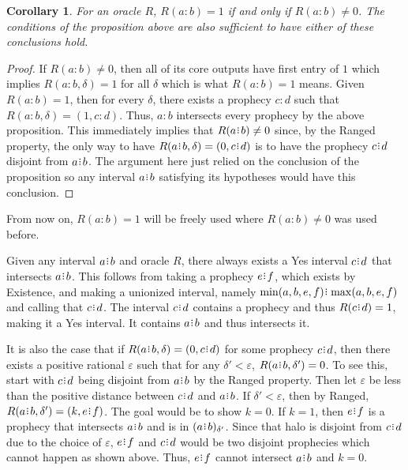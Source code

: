 \documentclass[12pt]{article}
\newtheorem{corollary}{Corollary}[section]
\begin{document}
\begin{corollary}
    For an oracle $R$, $R(a:b) = 1$ if and only if $R(a:b) \neq 0$. The conditions of the proposition above are also sufficient to have either of these conclusions hold. 
\end{corollary}

\begin{proof}
    If $R(a:b) \neq 0$, then all of its core outputs have first entry of $1$ which implies $R(a:b, \delta)=1$ for all $\delta$ which is what $R(a:b) = 1$ means. Given $R(a:b)= 1$, then for every $\delta$, there exists a prophecy $c:d$ such that $R(a:b, \delta) = (1, c:d)$. Thus, $a:b$ intersects every prophecy by the above proposition. This immediately implies that $R(a\rint b) \neq 0$ since, by the Ranged property, the only way to have $R(a\rint b, \delta) = (0, c\rint d)$ is to have the prophecy $c\rint d$ disjoint from $a\rint b$. The argument here just relied on the conclusion of the proposition so any interval $a \rint b$ satisfying its hypotheses would have this conclusion. 
\end{proof}

From now on, $R(a:b)=1$ will be freely used where $R(a:b) \neq 0$ was used before. 


Given any interval $a\rint b$ and oracle $R$, there always exists a Yes interval $c\rint d$ that intersects $a\rint b$. This follows from taking a prophecy $e\rint f$, which exists by Existence, and making a unionized interval, namely $\min(a,b,e,f)\rint \max(a,b,e,f)$ and calling that $c\rint d$. The interval $c\rint d$ contains a prophecy and thus $R(c\rint d) = 1$, making it a Yes interval. It contains $a\rint b$ and thus intersects it. 

It is also the case that if $R(a\rint b, \delta) = (0, c\rint d)$ for some prophecy $c\rint d$, then there exists a positive rational $\varepsilon$ such that for any $\delta' < \varepsilon$, $R(a\rint b, \delta') = 0$. To see this, start with $c\rint d$ being disjoint from $a\rint b$ by the Ranged property. Then let $\varepsilon$ be less than the positive distance between $c\rint d$ and $a\rint b$. If $\delta' < \varepsilon$, then by Ranged, $R(a\rint b, \delta') = (k, e\rint f)$. The goal would be to show $k=0$. If $k=1$, then $e\rint f$ is a prophecy that intersects $a\rint b$ and is in $\halo[\delta']{a\rint b}$. Since that halo is disjoint from $c\rint d$ due to the choice of $\varepsilon$, $e\rint f$ and $c\rint d$ would be two disjoint prophecies which cannot happen as shown above. Thus, $e\rint f$ cannot intersect $a\rint b$ and $k=0$.
\end{document}
